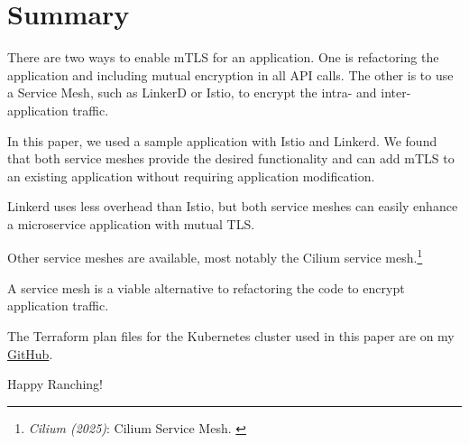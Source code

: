 %
%

\pagebreak
\section{Summary}

\onehalfspacing

There are two ways to enable mTLS for an application. One is refactoring the application and including mutual encryption in all API calls. The other is to use a Service Mesh, such as LinkerD or Istio, to encrypt the intra- and inter-application traffic.

In this paper, we used a sample application with Istio and Linkerd. We found that both service meshes provide the desired functionality and can add mTLS to an existing application without requiring application modification.

Linkerd uses less overhead than Istio, but both service meshes can easily enhance a microservice application with mutual TLS. 

Other service meshes are available, most notably the Cilium service mesh.\footnote{\textit{Cilium (2025)}: Cilium Service Mesh. \cite{ciliumMesh}}

A service mesh is a viable alternative to refactoring the code to encrypt application traffic.

The Terraform plan files for the Kubernetes cluster used in this paper are on my \href{https://github.com/chfrank-cgn/Rancher/tree/master/aks-cluster}{GitHub}.

Happy Ranching!
